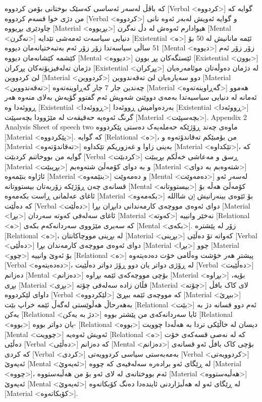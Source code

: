 کە باڤڵ لەسەر ئەساسی کەسێک بوختانی بۆمن کردووە [Verbal <کردووە>] گوایە کە من دژی خوا قسەم کردووە [Verbal <کردووە>] و گوایە ئەویش لەبەر ئەوە نانی چاودێری بڕیووه [Material <بڕیووه>] هیوادارم ئەوەش لە دڵ نەگرن [Mental <نەگرن>] دنیایی سیاسەت ئەمەشی تێدایە [Existential <ە>] ئێمە مانانیش لە 50 بۆ 51 ساڵی سیاسەتدا زۆر زۆر ئەم بەتبەختیانەمان دیووە [Mental <دیووە>] زۆر زۆر ئەم کێشمە کێشانەمان دیووە [Mental <دیووە>] ئێستگەکان پڕ بوون [Existential <بوون>] دژمان تەلەفیزیۆنەکان پڕکران [Existential <پڕکران>] لە دژمان دەوڵەتان موئامەرەیان لێ کردووین [Material <کردووین>] دوو سەیارەیان لێ تەقەندووین [Material <تەقەندووین>] چەندین جار 7 جار گەڕاوینەتەوە [Material <گەڕاوینەتەوە>] هەموو ئەمانە لە دنیایی سیاسیەتدا بەمەی دووێنێ شەویش ئەم گفتوو گۆیەش بەلای منەوە هەر ڕووئەدا وە [Existential <ڕووئەدا>] بەردەوامیش ڕووئەدا [Existential <ڕووئەدا>] گرنگ ئەوەیە حەقیقەت لە مێژوودا بچەسپێت [Material <بچەسپێت>].
Appendix 2
Analysis Sheet of speech two
ماوەی چەند ڕۆژێکە حەملەیەک دەستی پێکردووە [Material <پێکردووە>]. کە گوایە [Relational <ە>]، من بۆمبێکم تەقاندۆتەوە و [Material <تەقاندۆتەوە>] بەینی زاوا و غەزوریکم تێکداوە [Material <تێکداوە>]، کە گوایە من بووخاتنم کردبێت [Verbal <کردبێت>] ڕسق و مەعاشی خەڵکم بڕیبێت [Material <بڕیبێت>] و بە دوای کۆمەڵێ شتەوەبم [Material <شتەوەبم بە دوای>] ئاژاوە بنێمەوە [Material <بنێمەوە>] و دەمەوێت [Mental <دەمەوێت>] لەسەر ئەو قسانەی چەن ڕۆژێکە زۆربەتان بیستووتانە [Mental <بیستووتانە>] کۆمەڵێ هەڵە بۆ ئاغای عەلمانی ڕاست بکەمەوە [Material <بکەمەوە>] بۆ ئێوەی بینەرانیش ٳن شااللە کە دەڵێت [Verbal <دەڵێت>] دوای ئەوەی مووچەی کارمەندانی دابڕان بڕا [Material <بڕا>] ئاغای سەلەفی کەوتە سەردان [Material <کەوتە>] نەخێر وانییە [Relational <ە>] کە سەیری مێژووی سەردانەکەم بکەی [Mental <بکەی>].
زۆر لە پێشترە [Relational <ە>]، لە بڕینی مووچاکانتان [Material <بڕینی>] کەواتە تۆ دەڵێی [Verbal <دەڵێی>] دوای ئەوەی مووچەی کارمەندان بڕا [Material <بڕا>] چوو [Material <چوو>] بۆ ئەوێ وانییە [Relational <ە>] پیشتر هەر خۆشت وەڵامی خۆت دەدەیتەوە [Verbal <دەدەیتەوە>]، لە ڕۆژی دواتر یان دوو ڕۆژ دواتر دەڵێیت [Verbal <دەڵێیت>] دەزانم [Mental <دەزانم>] بۆچی مووچەکەی ئێمە بڕاوە [Material <بڕاوە>] بۆیە، بڕی [Material <بڕی>] فڵان زادە سەلەفی چۆتە [Material <چۆتە>] لای کاک بافڵ داوای لێکردووە [Verbal <لێکردووە>] کە مووچەی ئێمە ببڕێ [Material <ببڕێ>] بەهەرحاڵ هەڵوێستی لەگەڵ ئێمە خراپ بێت [Relational <بێت>] ئەم دوو قسانە دژ بە یەکن [Relational <دژ بە یەکن>] ئایا سەردانەکەی من پێشتر بووە [Relational <بووە>] یان دواتر بووە- [Relational <بووە>] دیسان لە خاڵێکی تردا بە هەڵەدا چوویت [Mental <چوویت>] ئەویش ئەوەیە [Relational <ە>] کە لە نەصی قسەکەی خۆت دەڵێی [Verbal <دەڵێی>] کە دەزانم [Mental <دەزانم>] بۆچی کاک بافڵ ئەو قسانەی کە کردی [Verbal <کردی>] بەمەبەستی سیاسی کردوویەتی [Verbal <کردوویەتی>] ئەیەوێ [Mental <ئەیەوێ>] لە ڕێگای ئەو برادەرە سەلەفیەی کە چووە [Material <چووە>]، ئەم بووختانەی لە لای ئەو بۆ من هەڵبەستووە [Material <هەڵبەستووە>] ئەیەوێ [Mental <ئەیەوێ>] لە ڕێگای ئەو لە هەڵبژاردنی ئایندەدا دەنگ کۆبکاتەوە [Material <کۆبکاتەوە>].
